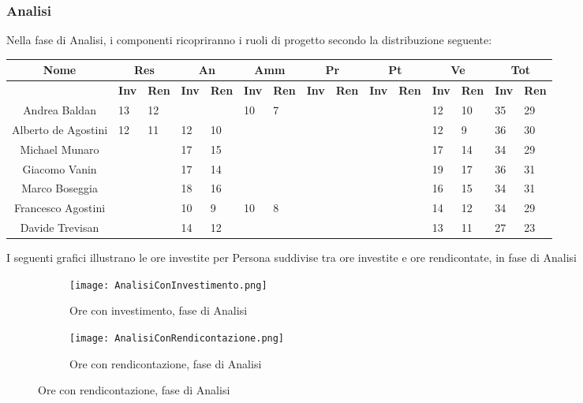 \documentclass{scalatekids-article}
\begin{document}
\subsubsection{Analisi}
Nella fase di Analisi, i componenti ricopriranno i ruoli di progetto secondo la distribuzione seguente:
\begin{center}
  \scriptsize
  \begin{tabular}{| c | p{0.35cm} p{0.35cm} | p{0.35cm} p{0.35cm} | p{0.35cm} p{0.35cm} | p{0.35cm} p{0.35cm} | p{0.35cm} p{0.35cm} | p{0.35cm} p{0.35cm} | p{0.35cm} p{0.35cm} |}
    \hline
    \textbf{Nome} & \multicolumn{2}{|c|}{\textbf{Res}} & \multicolumn{2}{|c|}{\textbf{An}} & \multicolumn{2}{|c|}{\textbf{Amm}} & \multicolumn{2}{|c|}{\textbf{Pr}} & \multicolumn{2}{|c|}{\textbf{Pt}} & \multicolumn{2}{|c|}{\textbf{Ve}} & \multicolumn{2}{|c|}{\textbf{Tot}}\\
    \hline
    & \textbf{Inv} & \textbf{Ren} & \textbf{Inv} & \textbf{Ren} & \textbf{Inv} & \textbf{Ren} & \textbf{Inv} & \textbf{Ren} & \textbf{Inv} & \textbf{Ren} & \textbf{Inv} & \textbf{Ren} & \textbf{Inv} & \textbf{Ren}\\
    \hline
    Andrea Baldan & 13 & 12 & & & 10 & 7 & & & & & 12 & 10 & 35 & 29\\
    Alberto de Agostini & 12 & 11 & 12 & 10 & & & & & & & 12 & 9 & 36 & 30\\
    Michael Munaro & & & 17 & 15 & & & & & & & 17 & 14 & 34 & 29\\
    Giacomo Vanin & & & 17 & 14 & & & & & & & 19 & 17 & 36 & 31\\
    Marco Boseggia & & & 18 & 16 & & & & & & & 16 & 15 & 34 & 31\\
    Francesco Agostini & & & 10 & 9 & 10 & 8 & & & & & 14 & 12 & 34 & 29\\
    Davide Trevisan & & & 14 & 12 & & & & & & & 13 & 11 & 27 & 23\\
    \hline
  \end{tabular}
\end{center}
I seguenti grafici illustrano le ore investite per Persona suddivise tra ore investite e ore rendicontate, in fase di Analisi
\begin{figure}[H]
  \begin{subfigure}[H]{0.47\textwidth}
    \texttt{[image: AnalisiConInvestimento.png]}
    \caption{Ore con investimento, fase di Analisi}
  \end{subfigure}
  \qquad
  \begin{subfigure}[H]{0.47\textwidth}
    \texttt{[image: AnalisiConRendicontazione.png]}
    \caption{Ore con rendicontazione, fase di Analisi}
  \end{subfigure}
\end{figure}
\end{document}
